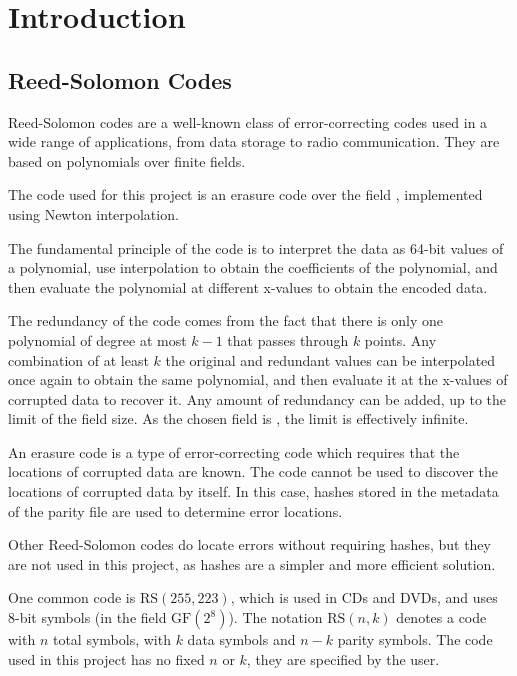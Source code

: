 \chapter{Introduction}

\section{Reed-Solomon Codes}

Reed-Solomon codes are a well-known class of error-correcting codes used in a wide range of applications, from data storage to radio communication.
They are based on polynomials over finite fields. \cite{theory-of-error-correcting-codes}

The code used for this project is an erasure code over the field , implemented using Newton interpolation.

The fundamental principle of the code is to interpret the data as 64-bit values of a polynomial, use interpolation to obtain the coefficients of the polynomial,
and then evaluate the polynomial at different x-values to obtain the encoded data.

The redundancy of the code comes from the fact that there is only one polynomial of degree at most $k - 1$ that passes through $k$ points.
Any combination of at least $k$ the original and redundant values can be interpolated once again to obtain the same polynomial,
and then evaluate it at the x-values of corrupted data to recover it.
Any amount of redundancy can be added, up to the limit of the field size. As the chosen field is , the limit is effectively infinite.

An erasure code is a type of error-correcting code which requires that the locations of corrupted data are known.
The code cannot be used to discover the locations of corrupted data by itself.
In this case, hashes stored in the metadata of the parity file are used to determine error locations.

Other Reed-Solomon codes do locate errors without requiring hashes, but they are not used in this project, as hashes are a simpler and more efficient solution.

One common code is $\text{RS}(255, 223)$, which is used in CDs and DVDs, and uses 8-bit symbols (in the field $\text{GF}(2^8)$).
The notation $\text{RS}(n, k)$ denotes a code with $n$ total symbols, with $k$ data symbols and $n - k$ parity symbols.
The code used in this project has no fixed $n$ or $k$, they are specified by the user.

